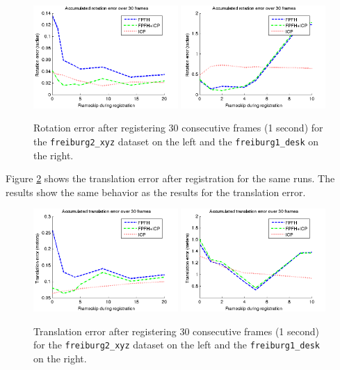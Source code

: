 \documentclass[a4paper]{article}
\begin{document}
\begin{figure}[htbp]
    \centering
        \includegraphics[width=0.49\textwidth]{ims/xyzAccumulatedrotationerrorover30frames.png}
        \includegraphics[width=0.49\textwidth]{ims/deskAccumulatedrotationerrorover30frames.png}
    \caption{Rotation error after registering 30 consecutive frames (1 second) for the  \texttt{freiburg2\_xyz} dataset on the left and the \texttt{freiburg1\_desk} on the right.}
    \label{fig:accumulated_rotation_error}
\end{figure}

Figure \ref{fig:accumulated_translation_error} shows the translation error after registration for the same runs. The results show the same behavior as the results for the translation error. 

\begin{figure}[htbp]
    \centering
        \includegraphics[width=0.49\textwidth]{ims/xyzAccumulatedtranslationerrorover30frames.png}
        \includegraphics[width=0.49\textwidth]{ims/deskAccumulatedtranslationerrorover30frames.png}
    \caption{Translation error after registering 30 consecutive frames (1 second) for the  \texttt{freiburg2\_xyz} dataset on the left and the \texttt{freiburg1\_desk} on the right.}
    \label{fig:accumulated_translation_error}
\end{figure}
\end{document}
